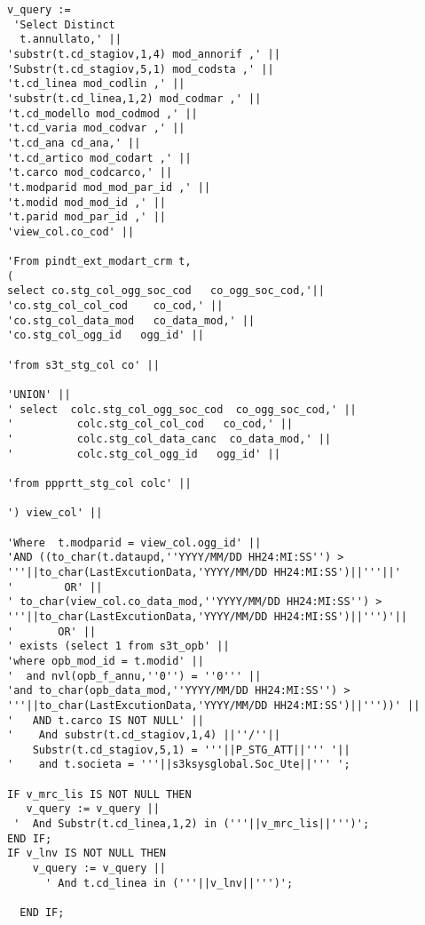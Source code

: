 \begin{lstlisting}
v_query :=
 'Select Distinct
  t.annullato,' ||
'substr(t.cd_stagiov,1,4) mod_annorif ,' ||
'Substr(t.cd_stagiov,5,1) mod_codsta ,' ||
't.cd_linea mod_codlin ,' ||
'substr(t.cd_linea,1,2) mod_codmar ,' ||
't.cd_modello mod_codmod ,' ||
't.cd_varia mod_codvar ,' ||
't.cd_ana cd_ana,' ||
't.cd_artico mod_codart ,' ||
't.carco mod_codcarco,' ||
't.modparid mod_mod_par_id ,' ||
't.modid mod_mod_id ,' ||
't.parid mod_par_id ,' ||
'view_col.co_cod' ||

'From pindt_ext_modart_crm t, 
(
select co.stg_col_ogg_soc_cod   co_ogg_soc_cod,'|| 
'co.stg_col_col_cod    co_cod,' ||
'co.stg_col_data_mod   co_data_mod,' ||
'co.stg_col_ogg_id   ogg_id' ||

'from s3t_stg_col co' ||

'UNION' ||
' select  colc.stg_col_ogg_soc_cod  co_ogg_soc_cod,' ||
'          colc.stg_col_col_cod   co_cod,' ||
'          colc.stg_col_data_canc  co_data_mod,' ||
'          colc.stg_col_ogg_id   ogg_id' ||

'from ppprtt_stg_col colc' ||

') view_col' ||

'Where  t.modparid = view_col.ogg_id' ||
'AND ((to_char(t.dataupd,''YYYY/MM/DD HH24:MI:SS'') > 
'''||to_char(LastExcutionData,'YYYY/MM/DD HH24:MI:SS')||'''||' 
'        OR' ||
' to_char(view_col.co_data_mod,''YYYY/MM/DD HH24:MI:SS'') > 
'''||to_char(LastExcutionData,'YYYY/MM/DD HH24:MI:SS')||''')'|| 
'       OR' ||
' exists (select 1 from s3t_opb' ||
'where opb_mod_id = t.modid' ||
'  and nvl(opb_f_annu,''0'') = ''0''' ||
'and to_char(opb_data_mod,''YYYY/MM/DD HH24:MI:SS'') > 
'''||to_char(LastExcutionData,'YYYY/MM/DD HH24:MI:SS')||'''))' ||
'   AND t.carco IS NOT NULL' ||
'    And substr(t.cd_stagiov,1,4) ||''/''||
    Substr(t.cd_stagiov,5,1) = '''||P_STG_ATT||''' '|| 
'    and t.societa = '''||s3ksysglobal.Soc_Ute||''' ';

IF v_mrc_lis IS NOT NULL THEN
   v_query := v_query ||
 '  And Substr(t.cd_linea,1,2) in ('''||v_mrc_lis||''')';
END IF;
IF v_lnv IS NOT NULL THEN
    v_query := v_query || 
      ' And t.cd_linea in ('''||v_lnv||''')';
    
  END IF;
  

\end{lstlisting}
